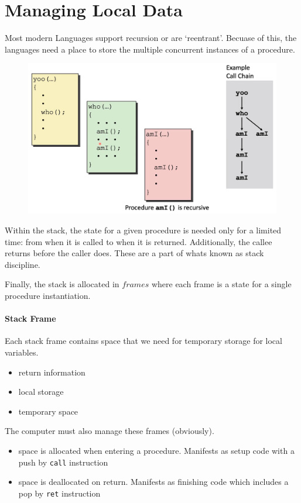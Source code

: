 \documentclass[12pt]{book}
\begin{document}
\section*{Managing Local Data}
Most modern Languages support recursion or are `reentrant'. 
Becuase of this, the languages need a place to store the multiple concurrent instances of a procedure.

\begin{figure}[h]
        \centering
        \includegraphics[scale = 0.2]{./figures/callchain}
\end{figure}

Within the stack, the state for a given procedure is needed only for a limited time: from when it is called
to when it is returned. Additionally, the callee returns before the caller does. These are a part of whats known as 
stack discipline.

Finally, the stack is allocated in $frames$ where each frame is a state for a single procedure
instantiation.

\paragraph{Stack Frame}
Each stack frame contains space that we need for temporary storage for local variables.
\begin{itemize}
        \item return information
        \item local storage
        \item temporary space
\end{itemize}

The computer must also manage these frames (obviously).
\begin{itemize}
        \item space is allocated when entering a procedure. Manifests as setup code with a push by \texttt{call}
                instruction
        \item space is deallocated on return. Manifests as finishing code which includes a pop by \texttt{ret}
                instruction
\end{itemize}
\end{document}
